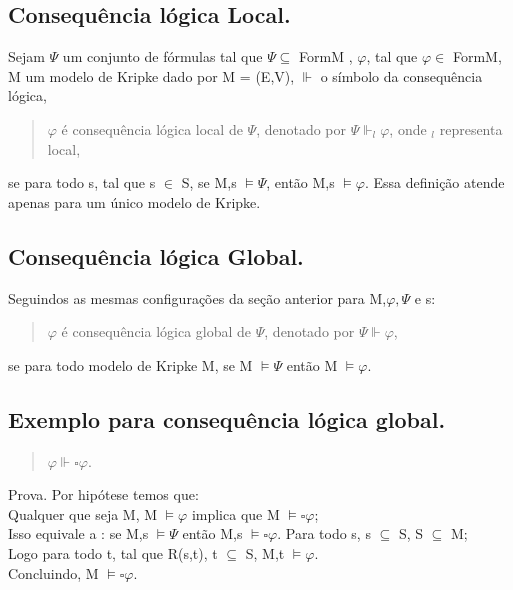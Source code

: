 \documentclass[12pt]{report}
\begin{document}
 \subsection{ Consequência lógica Local.}%
 \hspace{0.5cm} Sejam $\Psi$ um conjunto de fórmulas tal que $\Psi \subseteq $ FormM , $\varphi$, tal que $\varphi \in$ FormM, M um modelo de Kripke dado por M = (E,V), $\Vdash $ o símbolo da consequência lógica, 
 \begin{quote}
 $\varphi$ é consequência lógica local de $\Psi$, denotado por $\Psi \Vdash_{l} \varphi $, onde $_{l}$ representa local,
 \end{quote}
 se para todo s, tal que s $\in$ S, se M,s $\models \Psi $, então M,s $\models \varphi $. Essa definição atende apenas para um único modelo de Kripke.
 \subsection{Consequência lógica Global.}%
 \hspace{0.5cm} Seguindos as mesmas configurações da seção anterior para M,$\varphi , \Psi $ e s:
 \begin{quote}
  \hspace{0.5cm} $\varphi$ é consequência lógica global de $\Psi$, denotado por $\Psi \Vdash \varphi $,
  \end{quote}
  se para todo modelo de Kripke M, se M $\models \Psi$ então M $\models \varphi $. 
  \subsection{ Exemplo para consequência lógica global.}%
   \begin{quote}
   $\varphi \Vdash \square \varphi $.
   \end{quote}
   Prova. Por hipótese temos que:\\
   Qualquer que seja M, M $\models \varphi $ implica que M $\models \square \varphi $;\\
   Isso equivale a : se M,s $\models \Psi$ então M,s $\models \square \varphi$. Para todo s, s $\subseteq $ S, S $\subseteq $ M;\\
   Logo para todo t, tal que R(s,t), t $\subseteq $ S, M,t $\models \varphi $.\\
   Concluindo, M $\models \square \varphi $.
\end{document}
